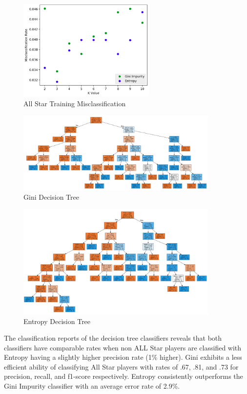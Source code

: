 \documentclass{article}
\begin{document}
\begin{figure}[hbt!]
  \centering
  \includegraphics[width=6.8cm]{decision_training_error.png}
  \caption{All Star Training Misclassification}
\end{figure}

\begin{figure}[hbt!]
  \centering
  \includegraphics[width=10cm]{gini_decission.png}
  \caption{Gini Decision Tree}
\end{figure}

\begin{figure}[hbt!]
  \centering
  \includegraphics[width=10cm]{entropy_decision.png}
  \caption{Entropy Decision Tree}
\end{figure}

The classification reports of the decision tree classifiers reveals that both classifiers have comparable rates when non ALL Star players are classified with Entropy having a slightly higher precision rate (1\% higher). Gini exhibits a less efficient ability of classifying All Star players with rates of .67, .81, and .73 for precision, recall, and f1-score respectively.  Entropy consistently outperforms the Gini Impurity classifier with an average error rate of 2.9\%.
\end{document}
